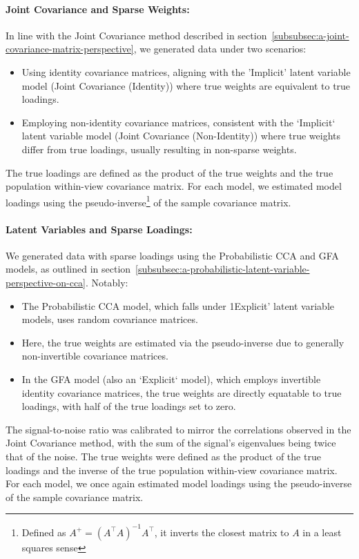 \paragraph{Joint Covariance and Sparse Weights:}
In line with the Joint Covariance method described in section~\ref{subsubsec:a-joint-covariance-matrix-perspective}, we generated data under two scenarios:
\begin{itemize}
    \item Using identity covariance matrices, aligning with the 'Implicit' latent variable model (Joint Covariance (Identity)) where true weights are equivalent to true loadings.
    \item Employing non-identity covariance matrices, consistent with the `Implicit` latent variable model (Joint Covariance (Non-Identity)) where true weights differ from true loadings, usually resulting in non-sparse weights.
\end{itemize}
The true loadings are defined as the product of the true weights and the true population within-view covariance matrix.
For each model, we estimated model loadings using the pseudo-inverse\footnote{Defined as $A^+ = (A^\top A)^{-1} A^\top$, it inverts the closest matrix to $A$ in a least squares sense} of the sample covariance matrix.

\paragraph{Latent Variables and Sparse Loadings:}
We generated data with sparse loadings using the Probabilistic CCA and GFA models, as outlined in section~\ref{subsubsec:a-probabilistic-latent-variable-perspective-on-cca}. 
Notably:
\begin{itemize}
    \item The Probabilistic CCA model, which falls under 1Explicit' latent variable models, uses random covariance matrices. 
    \item Here, the true weights are estimated via the pseudo-inverse due to generally non-invertible covariance matrices.
    \item In the GFA model (also an `Explicit` model), which employs invertible identity covariance matrices, the true weights are directly equatable to true loadings, with half of the true loadings set to zero.
\end{itemize}
The signal-to-noise ratio was calibrated to mirror the correlations observed in the Joint Covariance method, with the sum of the signal's eigenvalues being twice that of the noise.
The true weights were defined as the product of the true loadings and the inverse of the true population within-view covariance matrix.
For each model, we once again estimated model loadings using the pseudo-inverse of the sample covariance matrix.


